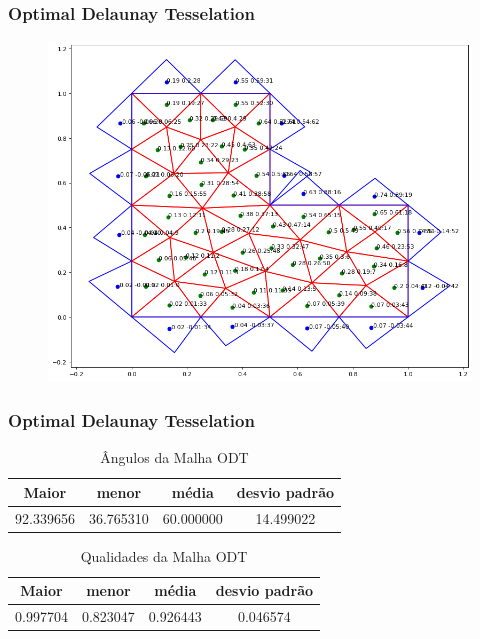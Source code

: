 \documentclass[brazil]{beamer}
\begin{document}
\begin{frame}
  \frametitle{Optimal Delaunay Tesselation}

  \begin{figure}
    \includegraphics[width=0.6\linewidth]{fig/malha-odt.png}
  \end{figure}

\end{frame}
\begin{frame}
  \frametitle{Optimal Delaunay Tesselation}

  \begin{table}[hb]
    \centering
    \par\caption{Ângulos da Malha ODT}
    \begin{tabular}{c|c|c|c}
      Maior      & menor     & média     & desvio padrão \\\hline\hline
      92.339656&36.765310&60.000000&14.499022\\\hline
    \end{tabular}
    \label{tab:angulos-malha-odt}
  \end{table}

  \begin{table}[hb]
    \centering
    \par\caption{Qualidades da Malha ODT}
    \begin{tabular}{c|c|c|c}
      Maior    & menor    & média    & desvio padrão \\\hline\hline
      0.997704&0.823047&0.926443&0.046574\\\hline
    \end{tabular}
    \label{tab:qualidades-malha-odt}
  \end{table}

\end{frame}
\end{document}
